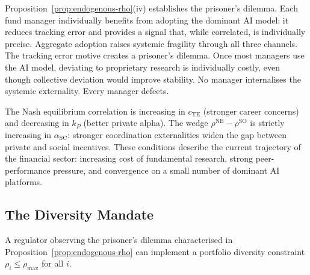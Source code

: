 Proposition~\ref{prop:endogenous-rho}(iv) establishes the prisoner's dilemma. Each fund manager individually benefits from adopting the dominant AI model: it reduces tracking error and provides a signal that, while correlated, is individually precise. Aggregate adoption raises systemic fragility through all three channels. The tracking error motive creates a prisoner's dilemma. Once most managers use the AI model, deviating to proprietary research is individually costly, even though collective deviation would improve stability. No manager internalises the systemic externality. Every manager defects.

The Nash equilibrium correlation is increasing in $c_{\text{TE}}$ (stronger career concerns) and decreasing in $k_P$ (better private alpha). The wedge $\rho^{\text{NE}} - \rho^{\text{SO}}$ is strictly increasing in $\alpha_{\text{SC}}$: stronger coordination externalities widen the gap between private and social incentives. These conditions describe the current trajectory of the financial sector: increasing cost of fundamental research, strong peer-performance pressure, and convergence on a small number of dominant AI platforms.

\subsection{The Diversity Mandate}

A regulator observing the prisoner's dilemma characterised in Proposition~\ref{prop:endogenous-rho} can implement a portfolio diversity constraint $\rho_i \leq \rho_{\max}$ for all $i$.

